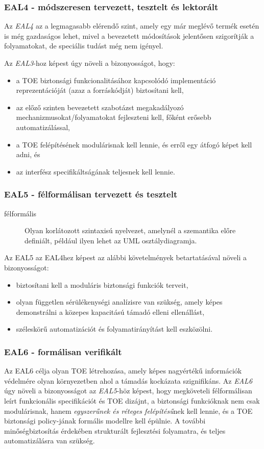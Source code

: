 \subsubsection{EAL4 - módszeresen tervezett, tesztelt és lektorált}
Az \emph{EAL4} az a legmagasabb elérendő szint, amely egy már meglévő termék esetén is még
gazdaságos lehet, mivel a bevezetett módosítások jelentősen szigorítják a folyamatokat, de speciális
tudást még nem igényel.

Az \emph{EAL3}-hoz képest úgy növeli a bizonyosságot, hogy:
\begin{itemize}
    \item a TOE biztonsági funkcionalitásához kapcsolódó implementáció reprezentációját
        (azaz a forráskódját) biztosítani kell,
    \item az előző szinten bevezetett szabotázst megakadályozó mechanizmusokat/folyamatokat
        fejleszteni kell, főként erősebb automatizálással,
    \item a TOE felépítésének modulárisnak kell lennie, és erről egy átfogó képet kell adni, és
    \item az interfész specifikáltságának teljesnek kell lennie.
\end{itemize}

\subsubsection{EAL5 - félformálisan tervezett és tesztelt}
\begin{description}
    \item[félformális]{Olyan korlátozott szintaxisú nyelvezet, amelynél a szemantika előre
        definiált, például ilyen lehet az UML osztálydiagramja.}
\end{description}

Az EAL5 az EAL4hez képest az alábbi követelmények betartatásával növeli
a bizonyosságot:
\begin{itemize}
    \item biztosítani kell a moduláris biztonsági funkciók terveit,
    \item olyan független sérülékenységi analízisre van szükség, amely képes demonstrálni a közepes
        kapacitású támadó elleni ellenállást,
    \item széleskörű automatizációt és folyamatirányítást kell eszközölni.
\end{itemize}

\subsubsection{EAL6 - formálisan verifikált}
Az EAL6 célja olyan TOE létrehozása, amely képes nagyértékű információk védelmére olyan környezetben
ahol a támadás kockázata szignifikáns.  Az \emph{EAL6} úgy növeli a bizonyosságot az \emph{EAL5}-höz
képest, hogy megköveteli félformálisan leírt funkcionális specifikációt és TOE dizájnt, a biztonsági
funkcióknak nem csak modulárisnak, hanem \emph{egyszerűnek és réteges felépítésű}nek kell lennie, és
a TOE biztonsági policy-jának formális modellre kell épülnie. A további minőségbiztosítás érdekében
strukturált fejlesztési folyamatra, és teljes automatizálásra van szükség.


